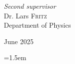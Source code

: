 \documentclass[12pt,a4paper]{report}
\theoremstyle{definition}
\theoremstyle{remark}
\newcommand{\?}{\stackrel{?}{=}}
\begin{document}
\begin{titlepage}
	\large
	\textit{Second supervisor}\\
	Dr. Lars \textsc{Fritz}\\
	\normalsize Department of Physics
	
	\vfill\vfill\vfill  %
	
	{\large June 2025} 
	
	\vfill  %
\end{titlepage}

\setcounter{page}{2}  %
	


	
\tableofcontents
	
\clearpage  %





	


	






%
%

\emergencystretch=1.5em

\printbibliography

	
\end{document}
